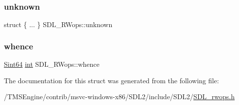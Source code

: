 \mbox{\label{struct_s_d_l___r_wops_a6b636d6299921142a119931d76a588b7}} 
\subsubsection{\texorpdfstring{unknown}{unknown}}
{\footnotesize\ttfamily struct \{ ... \}   S\+D\+L\+\_\+\+R\+Wops\+::unknown}

\mbox{\label{struct_s_d_l___r_wops_a95b96dcc6690897bfaf2d059f4378ed2}} 
\subsubsection{\texorpdfstring{whence}{whence}}
{\footnotesize\ttfamily \hyperlink{_s_d_l__stdinc_8h_a2c1a61d5c466bb74680be0a8cc1b455d}{Sint64} \hyperlink{struct_s_d_l___r_wops_ab303bcbb0f6742a141ba8b2998923f47}{int} S\+D\+L\+\_\+\+R\+Wops\+::whence}



The documentation for this struct was generated from the following file\+:\begin{DoxyCompactItemize}
\item 
/\+T\+M\+S\+Engine/contrib/msvc-\/windows-\/x86/\+S\+D\+L2/include/\+S\+D\+L2/\hyperlink{_s_d_l__rwops_8h}{S\+D\+L\+\_\+rwops.\+h}\end{DoxyCompactItemize}
